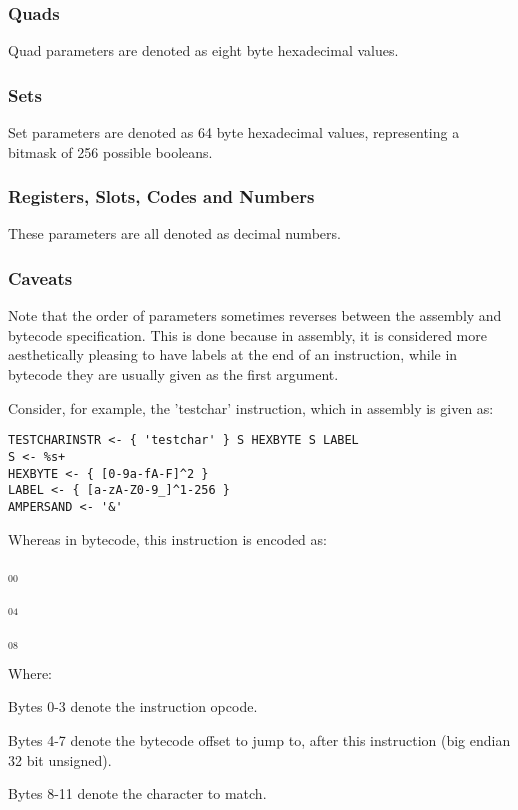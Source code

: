 \subsubsection{Quads}

Quad parameters are denoted as eight byte hexadecimal values.

\subsubsection{Sets}

Set parameters are denoted as 64 byte hexadecimal values, representing
a bitmask of 256 possible booleans.

\subsubsection{Registers, Slots, Codes and Numbers}

These parameters are all denoted as decimal numbers.

\subsubsection{Caveats}

Note that the order of parameters sometimes reverses between the assembly
and bytecode specification. This is done because in assembly, it is
considered more aesthetically pleasing to have labels at the end of an
instruction, while in bytecode they are usually given as the first argument.

Consider, for example, the 'testchar' instruction, which in assembly is
given as:

\begin{myquote}
\begin{verbatim}
TESTCHARINSTR <- { 'testchar' } S HEXBYTE S LABEL
S <- %s+
HEXBYTE <- { [0-9a-fA-F]^2 }
LABEL <- { [a-zA-Z0-9_]^1-256 }
AMPERSAND <- '&'
\end{verbatim}
\end{myquote}

Whereas in bytecode, this instruction is encoded as:

$_{00}$\ 



$_{04}$\ 



$_{08}$\ 
\fbox{%
  \parbox{20pt}{%
00
  }%
}

Where:
  
Bytes 0-3 denote the instruction opcode.

Bytes 4-7 denote the bytecode offset to jump to, after
this instruction (big endian 32 bit unsigned).

Bytes 8-11 denote the character to match.
